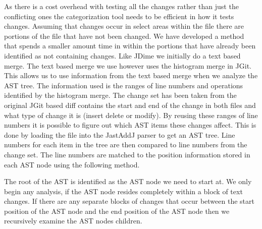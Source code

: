 As there is a cost overhead with testing all the changes rather than just the conflicting ones the categorization tool needs to be efficient in how it tests changes.  Assuming that changes occur in select areas within the file there are portions of the file that have not been changed.  We have developed a method that spends a smaller amount time in  within the portions that have already been identified as not containing changes.  Like JDime we initially do a text based merge.  The text based merge we use however uses the histogram merge in JGit.  This allows us to use information from the text based merge when we analyze the AST tree.  The information used is the ranges of line numbers and operations identified by the histogram merge. The change set has been taken from the original JGit based diff contains the start and end of the change in both files and what type of change it is (insert delete or modify).  By reusing these ranges of line numbers it is possible to figure out which AST items these changes affect. This is done by loading the file into the JastAddJ parser to get an AST tree. Line numbers for each item in the tree are then compared to line numbers from the change set. The line numbers are matched to the position information stored in each AST node using the following method.

The root of the AST is identified as the AST node we need to start at. 
We only begin any analysis, if the AST node resides completely within a block of text changes.
If there are any separate blocks of changes that occur between the start position of the AST node and the end position of the AST node then we recursively examine the AST nodes children.

% 
% 


